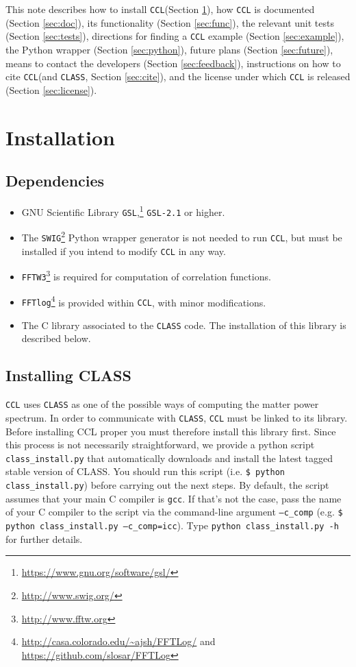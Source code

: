\documentclass[\docopts]{\docclass}
\newcommand{\ccl}{{\tt CCL}\xspace}
\begin{document}
This note describes how to install \ccl (Section \ref{sec:install}), how \ccl is documented (Section \ref{sec:doc}), its functionality (Section \ref{sec:func}), the relevant unit tests (Section \ref{sec:tests}), directions for finding a \ccl example (Section \ref{sec:example}), the Python wrapper (Section \ref{sec:python}), future plans (Section \ref{sec:future}), means to contact the developers (Section \ref{sec:feedback}), instructions on how to cite \ccl (and {\tt CLASS}, Section \ref{sec:cite}), and the license under which \ccl is released (Section \ref{sec:license}).


\section{Installation}
\label{sec:install}

\subsection{Dependencies}

\begin{itemize}
\item GNU Scientific Library {\tt GSL},\footnote{\url{https://www.gnu.org/software/gsl/}} {\tt GSL-2.1} or higher.
\item The {\tt SWIG}\footnote{\url{http://www.swig.org/}} Python wrapper generator is not needed to run \ccl, but must be installed if you intend to modify \ccl in any way.
\item {\tt FFTW3}\footnote{\url{http://www.fftw.org}} is required for computation of correlation functions.
\item {\tt FFTlog}\footnote{\url{http://casa.colorado.edu/~ajsh/FFTLog/} and \url{https://github.com/slosar/FFTLog}} is provided within \ccl, with minor modifications.
\item The C library associated to the {\tt CLASS} code. The installation of this library is described below. 
\end{itemize}

\subsection{Installing CLASS}
  {\tt CCL} uses {\tt CLASS} as one of the possible ways of computing the matter power spectrum. In order to communicate with {\tt CLASS}, {\tt CCL} must be linked to its library. Before installing CCL proper you must therefore install this library first. Since this process is not necessarily straightforward, we provide a python script {\tt class\_install.py} that automatically downloads and install the latest tagged stable version of CLASS. You should run this script (i.e. {\tt \$ python class\_install.py}) before carrying out the next steps. By default, the script assumes that your main C compiler is {\tt gcc}. If that's not the case, pass the name of your C compiler to the script via the command-line argument {\tt --c\_comp} (e.g. {\tt \$ python class\_install.py --c\_comp=icc}). Type {\tt python class\_install.py -h} for further details.
\end{document}
